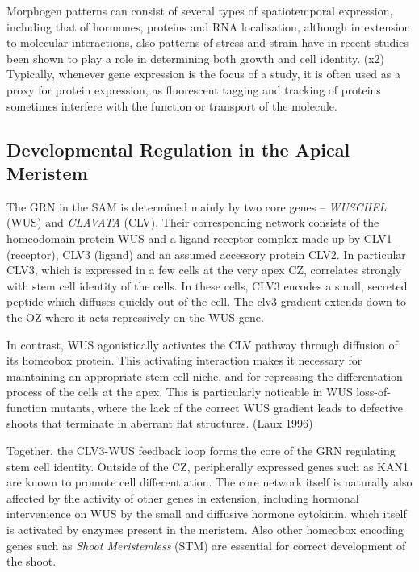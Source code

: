 Morphogen patterns can consist of several
types of spatiotemporal expression, including that of hormones, proteins and
RNA localisation, although in extension to molecular interactions, also patterns
of stress and strain have in recent studies been shown to play a role in
determining both growth and cell identity. 
\CITE (x2) Typically, whenever gene expression is the focus of a study, it
is often used as a proxy for protein expression, as fluorescent tagging
and tracking of proteins sometimes interfere with the function or transport of
the molecule. 

\subsection{Developmental Regulation in the Apical Meristem} %
The GRN in the SAM is determined mainly by two core genes -- \textit{WUSCHEL} (WUS) and
\textit{CLAVATA} (CLV). Their corresponding network consists of the homeodomain
protein WUS and a ligand-receptor complex made up by CLV1 (receptor), CLV3 (ligand) and
an assumed accessory protein CLV2. In particular CLV3, which is expressed in a
few cells at the very apex CZ, correlates strongly with stem cell identity of
the cells. In these cells, CLV3 encodes a small, secreted peptide which diffuses quickly
out of the cell. The clv3 gradient extends down to the OZ where it acts
repressively on the WUS gene.

\FIG {}

In contrast, WUS agonistically  
activates the CLV pathway through diffusion of its homeobox protein. This activating
interaction makes it necessary for maintaining an appropriate stem
cell niche, and for repressing the differentation process of the cells at the
apex. This is particularly noticable in WUS loss-of-function mutants, where the
lack of the correct WUS gradient leads to defective shoots that terminate in
aberrant flat structures. \CITE (Laux 1996) 

Together, the CLV3-WUS feedback loop forms the core of the GRN regulating stem
cell identity. Outside of the CZ, peripherally expressed genes such as KAN1 \CITE 
are known to promote cell differentiation. The core network itself is naturally
also affected by the activity of other genes in extension, including hormonal
intervenience on WUS by the small and diffusive hormone cytokinin, which itself
is activated by enzymes present in the meristem. Also other homeobox encoding
genes such as \textit{Shoot Meristemless} (STM) are essential for correct
development of the shoot. 

